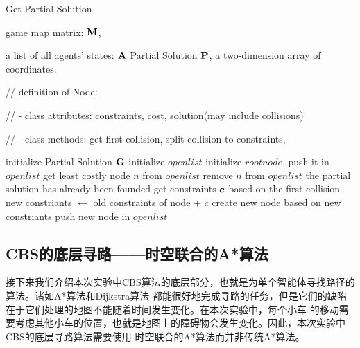 \documentclass[UTF8]{ctexart}  %
\begin{document}
\begin{algorithm}[H]
    \renewcommand{\algorithmicrequire}{\textbf{Input:}}
	\renewcommand{\algorithmicensure}{\textbf{Output:}}
    \caption{Get Partial Solution}
    \label{alg:example}
    \begin{algorithmic}[2]
        \REQUIRE 
            game map matrix: $\bf M$,

            a list of all agents' states: $\bf A$
        \ENSURE
            Partial Solution $\bf P$, a two-dimension array of coordinates.

        // definition of Node: 

        // - class attributes: constraints, cost, solution(may include collisions)
        
        // - class methods: get first collision, split collision to constraints, 

        \STATE initialize Partial Solution $\bf G$  
        \STATE initialize $open list$
        \STATE initialize $root node$, push it in $open list$
            \STATE get least costly node $n$ from $open list$
            \STATE remove $n$ from $open list$
                \STATE the partial solution has already been founded
            \ELSE
                \STATE get constraints $\bf c$ based on the first collision
                    \STATE new constriants $\gets$ old constraints of node + $c$
                    \STATE create new node based on new constriants
                    \STATE push new node in $open list$
                \ENDFOR
            \ENDIF
        \ENDWHILE
    \end{algorithmic}
\end{algorithm}


\subsection{CBS的底层寻路——时空联合的A*算法}
接下来我们介绍本次实验中CBS算法的底层部分，也就是为单个智能体寻找路径的算法。诸如A*算法和Dijkstra算法
都能很好地完成寻路的任务，但是它们的缺陷在于它们处理的地图不能随着时间发生变化。在本次实验中，每个小车
的移动需要考虑其他小车的位置，也就是地图上的障碍物会发生变化。因此，本次实验中CBS的底层寻路算法需要使用
时空联合的A*算法而并非传统A*算法。
\end{document}
